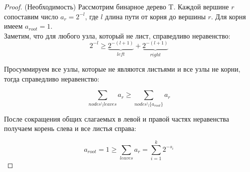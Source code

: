 \begin{proof}(Необходимость)
    Рассмотрим бинарное дерево T. Каждой вершине $r$ сопоставим число 
    $a_r = 2^{-l}$, где $l$ длина пути от корня до вершины $r$. Для 
    корня имеем $a_{root} = 1$.\\
    Заметим, что для любого узла, который не лист, справедливо неравенство:
    \[2^{-l} \geq \underbrace{2^{-(l+1)}}_{left} + \underbrace{2^{-(l+1)}}_{right}\]
    
    Просуммируем все узлы, которые не являются листьями и все узлы не корни, тогда справедливо неравенство:

    \[\sum_{nodes \setminus leaves} a_r \geq \sum_{nodes \setminus \{a_{root}\}} a_r\]

    После сокращения общих слагаемых в левой и правой частях неравенства получаем корень слева и все листья справа:

    \[a_{root} = 1 \geq \sum_{leaves} a_r = \sum_{i=1}^{k} 2^{-s_i}\]

\end{proof}

